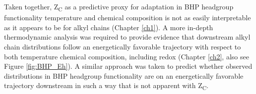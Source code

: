 
Taken together, Z\textsubscript{C} as a predictive proxy for adaptation in BHP headgroup functionality temperature and chemical composition is not as easily interpretable as it appears to be for alkyl chains (Chapter \ref{ch1}). A more in-depth thermodynamic analysis was required to provide evidence that downstream alkyl chain distributions follow an energetically favorable trajectory with respect to both temperature chemical composition, including redox (Chapter \ref{ch2}, also see Figure \ref{fig:BHP_Eh}). A similar approach was taken to predict whether observed distributions in BHP headgroup functionality are on an energetically favorable trajectory downstream in such a way that is not apparent with Z\textsubscript{C}.

